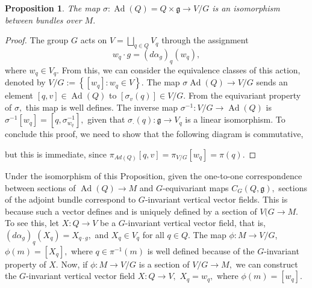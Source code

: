 \documentclass[12pt, letterpaper, reqno]{amsart}
\theoremstyle{definition}
\theoremstyle{plain}
\newtheorem{prop}{Proposition}
\theoremstyle{remark}
\begin{document}
\begin{prop}
	The map $ \sigma: \operatorname{Ad} (Q) = Q\times \mathfrak{g} \rightarrow V/G $ is an isomorphism between bundles over $ M. $ 
\end{prop}
\begin{proof}
	The group $ G $ acts on $ V = \bigsqcup_{q\in Q}V_q $ through the assignment $$ w_q\cdot g = (d\alpha_g)_q(w_q), $$ 
	where $ w_q\in V_q. $ From this, we can consider the equivalence classes of this action, denoted by $ V/G:= \left\{ [w_q]: w_q\in V \right\}.  $ The map $ \sigma \operatorname{Ad} (Q) \rightarrow V/G $ sends an element $ [q,v]\in \operatorname{Ad} (Q) $ to $ [\sigma_v(q)]\in V/G. $ From the equivariant property of $ \sigma, $ this map is well defines. The inverse map $ \sigma^{-1} : V/G \rightarrow \operatorname{Ad}(Q) $ is $ \sigma^{-1}[w_q] = [q,\sigma^{-1}_{w_q}], $ given that $ \sigma_\cdot(q): \mathfrak{g}\rightarrow V_q $ is a linear isomorphism. To conclude this proof, we need to show that the following diagram is commutative,
	\begin{center}
	\end{center}
	but this is immediate, since $ \pi_{Ad(Q)}[q,v]=\pi_{V/G}[w_q]=\pi(q). $ 
\end{proof}
Under the isomorphism of this Proposition, given the one-to-one correspondence between sections of $ \operatorname{Ad} (Q)\rightarrow M $ and $ G $-equivariant maps $ C_G(Q, \mathfrak{g}), $ sections of the adjoint bundle correspond to $ G $-invariant vertical vector fields. This is because such a vector defines and is uniquely defined by a section of $ V(G \rightarrow M. $ To see this, let $ X: Q \rightarrow V $ be a $ G $-invariant vertical vector field, that is, $ (d\alpha_g)_q(X_q) = X_{q\cdot g}, $ and $ X_q\in V_q $ for all $ q\in Q. $ The map $ \phi: M \rightarrow V/G $, $ \phi(m)= [X_q], $ where $ q\in \pi^{-1}(m) $ is well defined because of the $ G $-invariant property of $ X. $ Now, if $ \phi: M \rightarrow V/G $ is a section of $ V/G \rightarrow M, $ we can construct the $ G $-invariant vertical vector field $ X: Q \rightarrow V, $ $ X_q=w_q, $ where $ \phi(m)=[w_q]. $ 
\end{document}

